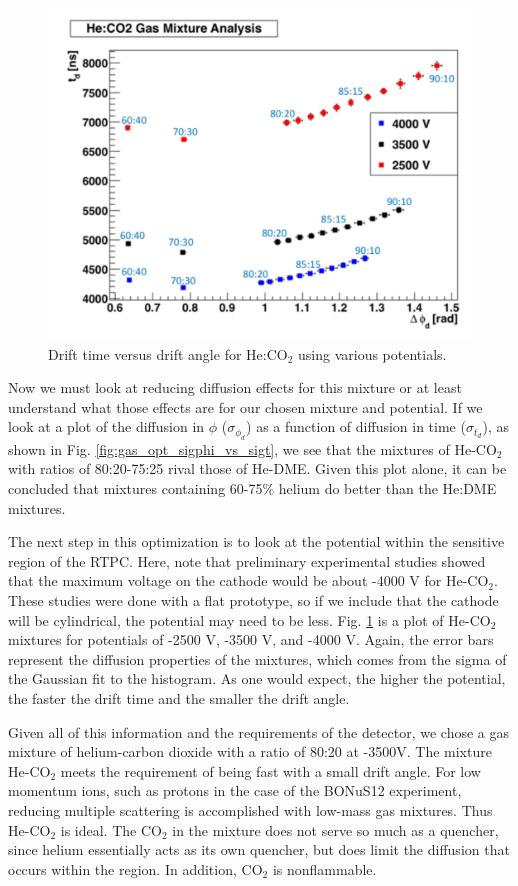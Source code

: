 \begin{figure}[h!]
	\centering
	\includegraphics[width=0.8\linewidth]{figures/gas_opt_pot.png}
	\caption{Drift time versus drift angle for He:CO$_2$ using various potentials.}
	\label{fig:gas_opt_pot}
\end{figure}

Now we must look at reducing diffusion effects for this mixture or at least understand what those effects are for our chosen mixture and potential. If we look at a plot of the diffusion in $\phi$ ($\sigma_{\phi_{d}}$) as a function of diffusion in time ($\sigma_{t_{d}}$), as shown in Fig.
\ref{fig:gas_opt_sigphi_vs_sigt}, we see that the mixtures of He-CO$_2$ with ratios of 80:20-75:25 rival those of He-DME. Given this plot alone, it can be concluded that mixtures containing 60-75\% helium do better than the He:DME mixtures.

The next step in this optimization is to look at the potential within the sensitive region of the RTPC. Here, note that preliminary experimental studies showed that the maximum voltage on the cathode would be about -4000 V for He-CO$_2$. These studies were done with a flat prototype, so if we include that the cathode will be cylindrical, the potential may need to be less. Fig. \ref{fig:gas_opt_pot} is a plot of He-CO$_2$ mixtures for potentials of -2500 V, -3500 V, and -4000 V. Again, the error bars represent the diffusion properties of the mixtures, which comes from the sigma of the Gaussian fit to the histogram. As one would expect, the higher the potential, the faster the drift time and the smaller the drift angle.

Given all of this information and the requirements of the detector, we chose a gas mixture of helium-carbon dioxide with a ratio of 80:20 at -3500V. The mixture He-CO$_2$ meets the requirement of being fast with a small drift angle. For low momentum ions, such as protons in the case of the BONuS12 experiment, reducing multiple scattering is accomplished with low-mass gas mixtures. Thus He-CO$_2$ is ideal. The CO$_2$ in the mixture does not serve so much as a quencher, since helium essentially acts as its own quencher, but does limit the diffusion that occurs within the region. In addition, CO$_2$ is nonflammable.

